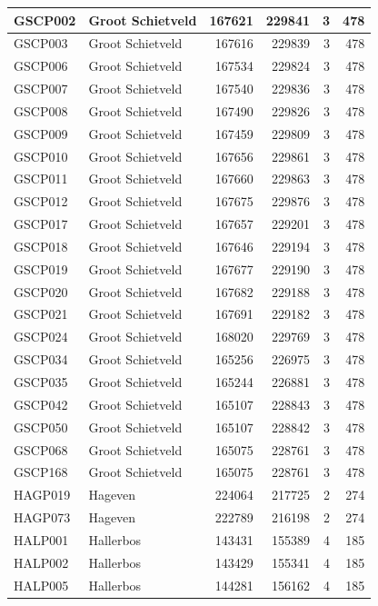 \documentclass[11pt,]{book}
\begin{document}
\begin{table}
\begin{tabular}[t]{l|l|r|r|r|r}
\hline
GSCP002 & Groot Schietveld & 167621 & 229841 & 3 & 478\\
\hline
GSCP003 & Groot Schietveld & 167616 & 229839 & 3 & 478\\
\hline
GSCP006 & Groot Schietveld & 167534 & 229824 & 3 & 478\\
\hline
GSCP007 & Groot Schietveld & 167540 & 229836 & 3 & 478\\
\hline
GSCP008 & Groot Schietveld & 167490 & 229826 & 3 & 478\\
\hline
GSCP009 & Groot Schietveld & 167459 & 229809 & 3 & 478\\
\hline
GSCP010 & Groot Schietveld & 167656 & 229861 & 3 & 478\\
\hline
GSCP011 & Groot Schietveld & 167660 & 229863 & 3 & 478\\
\hline
GSCP012 & Groot Schietveld & 167675 & 229876 & 3 & 478\\
\hline
GSCP017 & Groot Schietveld & 167657 & 229201 & 3 & 478\\
\hline
GSCP018 & Groot Schietveld & 167646 & 229194 & 3 & 478\\
\hline
GSCP019 & Groot Schietveld & 167677 & 229190 & 3 & 478\\
\hline
GSCP020 & Groot Schietveld & 167682 & 229188 & 3 & 478\\
\hline
GSCP021 & Groot Schietveld & 167691 & 229182 & 3 & 478\\
\hline
GSCP024 & Groot Schietveld & 168020 & 229769 & 3 & 478\\
\hline
GSCP034 & Groot Schietveld & 165256 & 226975 & 3 & 478\\
\hline
GSCP035 & Groot Schietveld & 165244 & 226881 & 3 & 478\\
\hline
GSCP042 & Groot Schietveld & 165107 & 228843 & 3 & 478\\
\hline
GSCP050 & Groot Schietveld & 165107 & 228842 & 3 & 478\\
\hline
GSCP068 & Groot Schietveld & 165075 & 228761 & 3 & 478\\
\hline
GSCP168 & Groot Schietveld & 165075 & 228761 & 3 & 478\\
\hline
HAGP019 & Hageven & 224064 & 217725 & 2 & 274\\
\hline
HAGP073 & Hageven & 222789 & 216198 & 2 & 274\\
\hline
HALP001 & Hallerbos & 143431 & 155389 & 4 & 185\\
\hline
HALP002 & Hallerbos & 143429 & 155341 & 4 & 185\\
\hline
HALP005 & Hallerbos & 144281 & 156162 & 4 & 185\\

\end{tabular}
\end{table}
\end{document}
